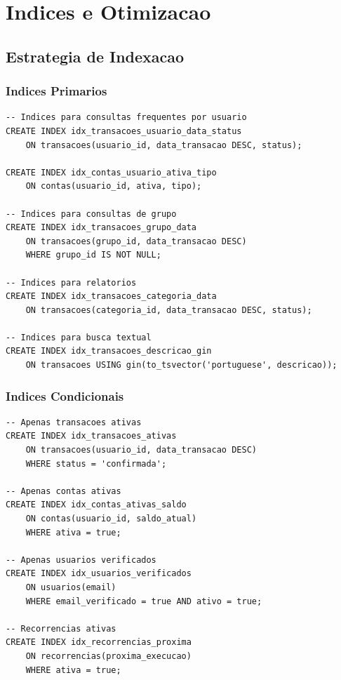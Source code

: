 \section{Indices e Otimizacao}

\subsection{Estrategia de Indexacao}

\subsubsection{Indices Primarios}

\begin{lstlisting}[caption=Indices essenciais para performance]
-- Indices para consultas frequentes por usuario
CREATE INDEX idx_transacoes_usuario_data_status 
    ON transacoes(usuario_id, data_transacao DESC, status);

CREATE INDEX idx_contas_usuario_ativa_tipo 
    ON contas(usuario_id, ativa, tipo);

-- Indices para consultas de grupo
CREATE INDEX idx_transacoes_grupo_data 
    ON transacoes(grupo_id, data_transacao DESC) 
    WHERE grupo_id IS NOT NULL;

-- Indices para relatorios
CREATE INDEX idx_transacoes_categoria_data 
    ON transacoes(categoria_id, data_transacao DESC, status);

-- Indices para busca textual
CREATE INDEX idx_transacoes_descricao_gin 
    ON transacoes USING gin(to_tsvector('portuguese', descricao));
\end{lstlisting}

\subsubsection{Indices Condicionais}

\begin{lstlisting}[caption=Indices otimizados com condicoes]
-- Apenas transacoes ativas
CREATE INDEX idx_transacoes_ativas 
    ON transacoes(usuario_id, data_transacao DESC) 
    WHERE status = 'confirmada';

-- Apenas contas ativas
CREATE INDEX idx_contas_ativas_saldo 
    ON contas(usuario_id, saldo_atual) 
    WHERE ativa = true;

-- Apenas usuarios verificados
CREATE INDEX idx_usuarios_verificados 
    ON usuarios(email) 
    WHERE email_verificado = true AND ativo = true;

-- Recorrencias ativas
CREATE INDEX idx_recorrencias_proxima 
    ON recorrencias(proxima_execucao) 
    WHERE ativa = true;
\end{lstlisting}

